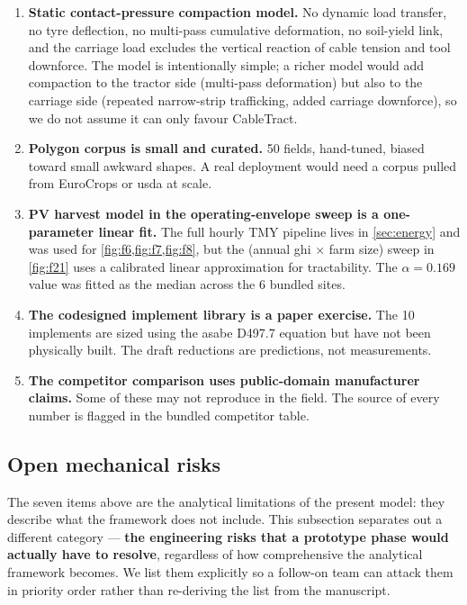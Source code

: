 \documentclass[11pt,a4paper]{article}
\begin{document}
\begin{enumerate}[leftmargin=1.8em,itemsep=0.2em]
    \item \textbf{Static contact-pressure compaction model.} No dynamic load transfer, no tyre deflection, no multi-pass cumulative deformation, no soil-yield link, and the carriage load excludes the vertical reaction of cable tension and tool downforce. The model is intentionally simple; a richer model would add compaction to the tractor side (multi-pass deformation) but also to the carriage side (repeated narrow-strip trafficking, added carriage downforce), so we do not assume it can only favour CableTract.
    \item \textbf{Polygon corpus is small and curated.} 50 fields, hand-tuned, biased toward small awkward shapes. A real deployment would need a corpus pulled from EuroCrops or \gls{usda} at scale.
    \item \textbf{PV harvest model in the operating-envelope sweep is a one-parameter linear fit.} The full hourly TMY pipeline lives in \cref{sec:energy} and was used for \cref{fig:f6,fig:f7,fig:f8}, but the (annual \gls{ghi} $\times$ farm size) sweep in \cref{fig:f21} uses a calibrated linear approximation for tractability. The $\alpha = 0.169$ value was fitted as the median across the 6 bundled sites.
    \item \textbf{The codesigned implement library is a paper exercise.} The 10 implements are sized using the \gls{asabe} D497.7 equation but have not been physically built. The draft reductions are predictions, not measurements.
    \item \textbf{The competitor comparison uses public-domain manufacturer claims.} Some of these may not reproduce in the field. The source of every number is flagged in the bundled competitor table.
\end{enumerate}

\subsection{Open mechanical risks}\label{sec:open-risks}

The seven items above are the analytical limitations of the present model: they describe what the framework does not include. This subsection separates out a different category --- \textbf{the engineering risks that a prototype phase would actually have to resolve}, regardless of how comprehensive the analytical framework becomes. We list them explicitly so a follow-on team can attack them in priority order rather than re-deriving the list from the manuscript.
\end{document}
